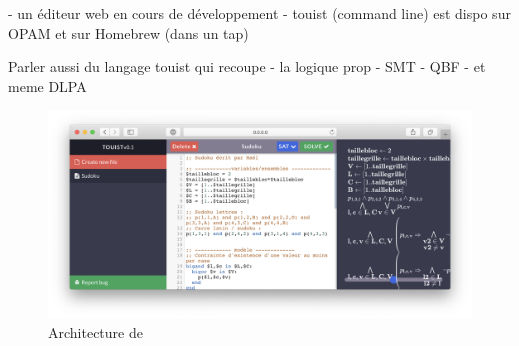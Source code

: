 - un éditeur web en cours de développement
- touist (command line) est dispo sur OPAM et sur Homebrew (dans un tap)

Parler aussi du langage touist qui recoupe
- la logique prop
- SMT
- QBF
- et meme DLPA
\begin{figure}
  \centering
  \includegraphics[scale=0.80]{figures/touist-web}
  \caption{Architecture de \touist}
  \label{fig:architectureTouisT}
\end{figure}